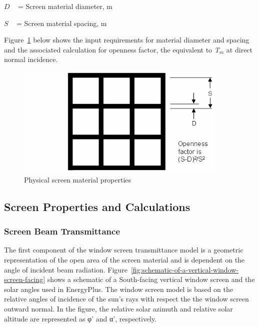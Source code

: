 \(D\) ~ = Screen material diameter, m

\(S\) ~ = Screen material spacing, m

Figure~\ref{fig:physical-screen-material-properties} below shows the input requirements for material diameter and spacing and the associated calculation for openness factor, the equivalent to \emph{T\(_{m}\)} at direct normal incidence.

\begin{figure}[hbtp] %
\centering
\includegraphics[width=0.9\textwidth, height=0.9\textheight, keepaspectratio=true]{media/image1153.png}
\caption{Physical screen material properties \protect \label{fig:physical-screen-material-properties}}
\end{figure}

\subsection{Screen Properties and Calculations}\label{screen-properties-and-calculations}

\subsubsection{Screen Beam Transmittance}\label{screen-beam-transmittance}

The first component of the window screen transmittance model is a geometric representation of the open area of the screen material and is dependent on the angle of incident beam radiation. Figure~\ref{fig:schematic-of-a-vertical-window-screen-facing} shows a schematic of a South-facing vertical window screen and the solar angles used in EnergyPlus. The window screen model is based on the relative angles of incidence of the sun's rays with respect the the window screen outward normal. In the figure, the relative solar azimuth and relative solar altitude are represented as φ' and α', respectively.

